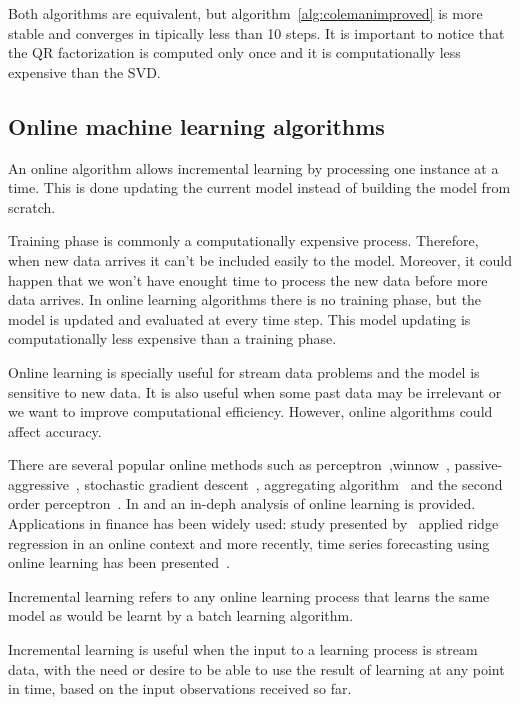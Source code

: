 Both algorithms are equivalent, but algorithm~\ref{alg:colemanimproved} is more
stable and converges in tipically less than 10 steps.
It is important to notice that the QR factorization is computed only once and it
is computationally less expensive than the SVD.

\subsection{Online machine learning algorithms}

An online algorithm allows incremental learning by processing one instance at a
time. This is done updating the current model instead of building the model from
scratch.

Training phase is commonly a computationally expensive process. Therefore, when
new data arrives it can't be included easily to the model. Moreover, it could
happen that we won't have enought time to process the new data before more data
arrives. In online learning algorithms there is no training phase, but the model
is updated and evaluated at every time step. This model updating is
computationally less expensive than a training phase.

Online learning is specially useful for stream data problems and the model is
sensitive to new data. It is also useful when some past data may be irrelevant
or we want to improve computational efficiency. However, online algorithms could
affect accuracy.

There are several popular online methods such as
perceptron~\cite{rosenblatt58},winnow~\cite{littlestone1988},
passive-aggressive~\cite{crammerETall2006}, stochastic gradient
descent~\cite{zhang2004}, aggregating algorithm~\cite{vovk2001} and the second
order perceptron~\cite{cesa-bianchi2005}.  In \cite{blum1998} and
\cite{cesa-bianchi2006} an in-deph analysis of online learning is provided.
Applications in finance has been widely used: study presented
by~\cite{arce+salinas2012} applied ridge regression in an online context and
more recently, time series forecasting using online learning has been
presented~\cite{anavaetAl2013}.

Incremental learning refers to any online learning process that learns the same
model as would be learnt by a batch learning algorithm. 

Incremental learning is useful when the input to a learning process is stream
data, with the need or desire to be able to use the result of learning at any
point in time, based on the input observations received so far. 

